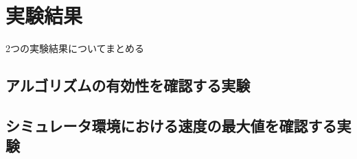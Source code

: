 \section{実験結果}
2つの実験結果についてまとめる

\subsection{アルゴリズムの有効性を確認する実験}



\subsection{シミュレータ環境における速度の最大値を確認する実験}
